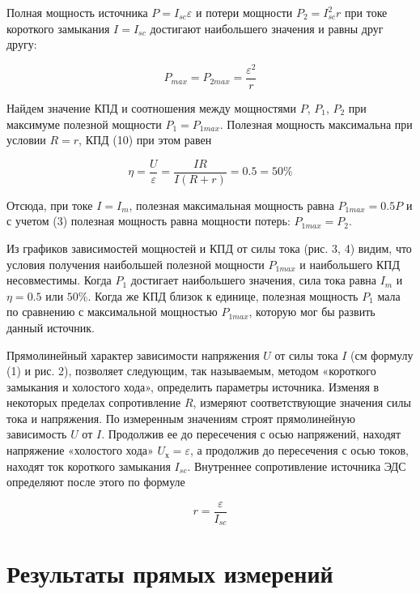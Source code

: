 \documentclass[12pt, a4paper]{article}
\begin{document}
Полная мощность источника $P = I_{sc}\varepsilon$ и потери мощности
$P_2 = I_{sc}^2r$ при токе короткого замыкания $I = I_{sc}$ достигают
наибольшего значения и равны друг другу:

\begin{equation}
P_{max} = P_{2max} = \frac{\varepsilon^2}{r}
\end{equation}

Найдем значение КПД и соотношения между мощностями $P$, $P_1$, $P_2$ при
максимуме полезной мощности $P_1 = P_{1max}$. Полезная мощность максимальна
при условии $R = r$, КПД (10) при этом равен

\begin{equation}
\eta = \frac{U}{\varepsilon} = \frac{IR}{I(R+r)} = 0.5 = 50\%
\end{equation}

Отсюда, при токе $I = I_m$, полезная максимальная мощность равна
$P_{1max} = 0.5 P$ и с учетом (3) полезная мощность равна мощности потерь:
$P_{1max} = P_2$.

Из графиков зависимостей мощностей и КПД от силы тока (рис. 3, 4) видим,
что условия получения наибольшей полезной мощности $P_{1max}$ и наибольшего
КПД несовместимы. Когда $P_1$ достигает наибольшего значения, сила тока равна
$I_m$ и $\eta = 0.5$ или $50\%$. Когда же КПД близок к единице, полезная
мощность $P_1$ мала по сравнению с максимальной мощностью $P_{1max}$,
которую мог бы развить данный источник.

Прямолинейный характер зависимости напряжения $U$ от силы тока $I$ (см
формулу (1) и рис. 2), позволяет следующим, так называемым, методом
«короткого замыкания и холостого хода», определить параметры источника.
Изменяя в некоторых пределах сопротивление $R$, измеряют соответствующие
значения силы тока и напряжения. По измеренным значениям строят
прямолинейную зависимость $U$ от $I$. Продолжив ее до пересечения с осью
напряжений, находят напряжение «холостого хода» $U_х = \varepsilon$,
а продолжив до пересечения с осью токов, находят ток короткого замыкания
$I_{sc}$. Внутреннее сопротивление источника ЭДС определяют после
этого по формуле

\begin{equation}
r = \frac{\varepsilon}{I_{sc}}
\end{equation}

\section*{Результаты прямых измерений}
\end{document}
